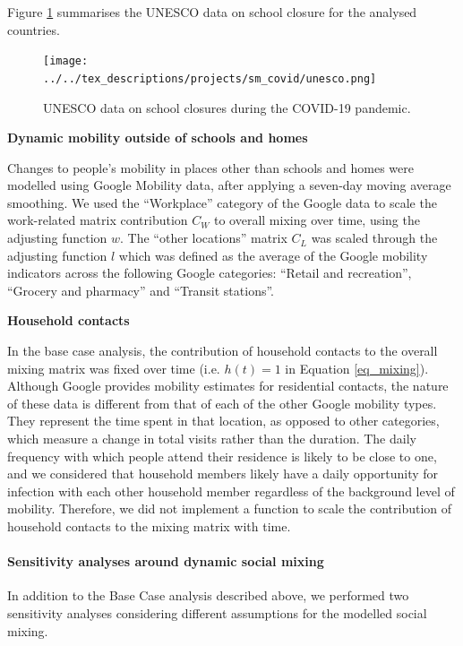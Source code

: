 Figure \ref{fig:unesco} summarises the UNESCO data on school closure for the analysed countries.

\begin{figure}[p]
  \begin{center}
  \texttt{[image: ../../tex\_descriptions/projects/sm\_covid/unesco.png]}
  \end{center}
  \caption{UNESCO data on school closures during the COVID-19 pandemic.
  } 
  \label{fig:unesco}
\end{figure}

\vspace{5pt}
\textbf{Dynamic mobility outside of schools and homes}

Changes to people's mobility in places other than schools and homes were modelled using Google Mobility data, after applying a seven-day moving average smoothing. We used the ``Workplace''
category of the Google data to scale the work-related matrix contribution $C_W$ to overall mixing over time, using the adjusting function
$w$. The ``other locations'' matrix $C_L$ was scaled through the adjusting function $l$ which was defined as the average of the Google mobility
indicators across the following Google categories: ``Retail and recreation'', ``Grocery and pharmacy'' and ``Transit stations''.

\vspace{5pt}
\textbf{Household contacts}

In the base case analysis, the contribution of household contacts to the overall mixing matrix was fixed over time 
(i.e. $h(t) = 1$ in Equation \ref{eq_mixing}). Although Google provides mobility 
estimates for residential contacts, the nature of these data is different from that of each of the other Google mobility 
types. They represent the time spent in that location, as opposed to other categories, which measure a change in total visits 
rather than the duration. The daily frequency with which people attend their residence is likely to be close to one, and we 
considered that household members likely have a daily opportunity for infection with each other household member regardless of
the background level of mobility. Therefore, we did not implement a function to scale the contribution of household contacts 
to the mixing matrix with time.

\paragraph{Sensitivity analyses around dynamic social mixing}
In addition to the Base Case analysis described above, we performed two sensitivity analyses considering
different assumptions for the modelled social mixing.

